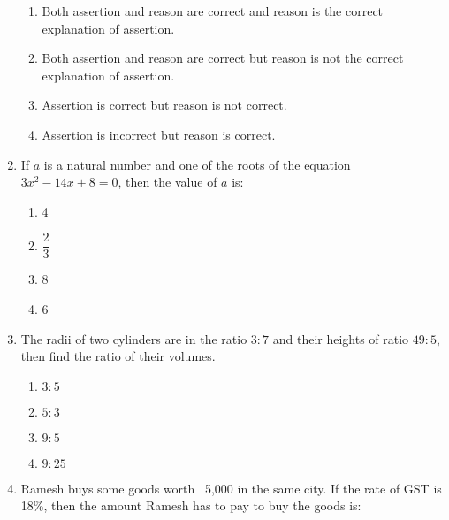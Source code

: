 \begin{enumerate}[label=(\roman*)]
        \begin{enumerate}[label={\alph*.}]
            \setlength\itemsep{0em}
            \item Both assertion and reason are correct and reason is the
                correct explanation of assertion.
            \item Both assertion and reason are correct but reason is not
                the correct explanation of assertion.
            \item Assertion is correct but reason is not correct.
            \item Assertion is incorrect but reason is correct.
        \end{enumerate}

    \item If $a$ is a natural number and one of the roots of the equation 
        $3x^2 - 14x + 8 = 0$, then the value of $a$ is:

        \begin{multicols}{2}
        \begin{enumerate}[label=(\alph*)]
            \item 4
            \item $\dfrac23$
            \item 8
            \item 6
        \end{enumerate}
        \end{multicols}

    \item The radii of two cylinders are in the ratio $3:7$ and their heights of 
        ratio $49:5$, then find the ratio of their volumes.

        \begin{multicols}{2}
        \begin{enumerate}[label=(\alph*)]
            \item $3:5$
            \item $5:3$
            \item $9:5$
            \item $9:25$
        \end{enumerate}
        \end{multicols}

    \item Ramesh buys some goods worth \rupee~5,000 in the same city. If the 
        rate of GST is 18\%, then the amount Ramesh has to pay to buy the 
        goods is:


\end{enumerate}
